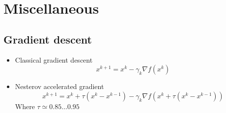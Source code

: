 \chapter{Miscellaneous}

\section{Gradient descent}
	\begin{itemize}
		\item Classical gradient descent
		$$x^{k + 1} = x^{k} - \gamma_k \nabla f(x^{k})$$
		\item Nesterov accelerated gradient
		$$x^{k + 1} = x^k + \tau(x^k - x^{k - 1}) - \gamma_k \nabla f(x^k + \tau(x^k - x^{k - 1}))$$
		Where $\tau \simeq 0.85 \ldots 0.95$
	\end{itemize}
